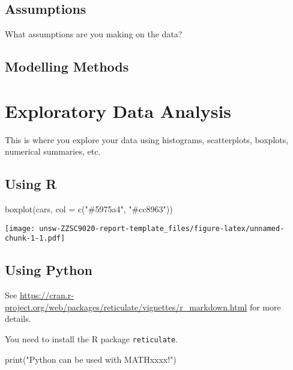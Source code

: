 \documentclass[mstat,12pt]{unswthesis}
\newenvironment{Shaded}{\begin{snugshade}}{\end{snugshade}}
\newcommand{\AttributeTok}[1]{\textcolor[rgb]{0.77,0.63,0.00}{#1}}
\newcommand{\BuiltInTok}[1]{#1}
\newcommand{\FunctionTok}[1]{\textcolor[rgb]{0.00,0.00,0.00}{#1}}
\newcommand{\NormalTok}[1]{#1}
\newcommand{\StringTok}[1]{\textcolor[rgb]{0.31,0.60,0.02}{#1}}
\begin{document}
\hypertarget{assumptions}{%
\section{Assumptions}\label{assumptions}}

What assumptions are you making on the data?

\hypertarget{modelling-methods}{%
\section{Modelling Methods}\label{modelling-methods}}

\hypertarget{exploratory-data-analysis}{%
\chapter{Exploratory Data Analysis}\label{exploratory-data-analysis}}

This is where you explore your data using histograms, scatterplots,
boxplots, numerical summaries, etc.

\hypertarget{using-r}{%
\section{Using R}\label{using-r}}

\begin{Shaded}
\begin{Highlighting}[]
\FunctionTok{boxplot}\NormalTok{(cars, }\AttributeTok{col =} \FunctionTok{c}\NormalTok{(}\StringTok{"\#5975a4"}\NormalTok{, }\StringTok{"\#cc8963"}\NormalTok{))}
\end{Highlighting}
\end{Shaded}

\texttt{[image: unsw-ZZSC9020-report-template\_files/figure-latex/unnamed-chunk-1-1.pdf]}

\hypertarget{using-python}{%
\section{Using Python}\label{using-python}}

See
\url{https://cran.r-project.org/web/packages/reticulate/vignettes/r_markdown.html}
for more details.

\bigskip

You need to install the R package \texttt{reticulate}.

\begin{Shaded}
\begin{Highlighting}[]
\BuiltInTok{print}\NormalTok{(}\StringTok{"Python can be used with MATHxxxx!"}\NormalTok{)}
\end{Highlighting}
\end{Shaded}
\end{document}

